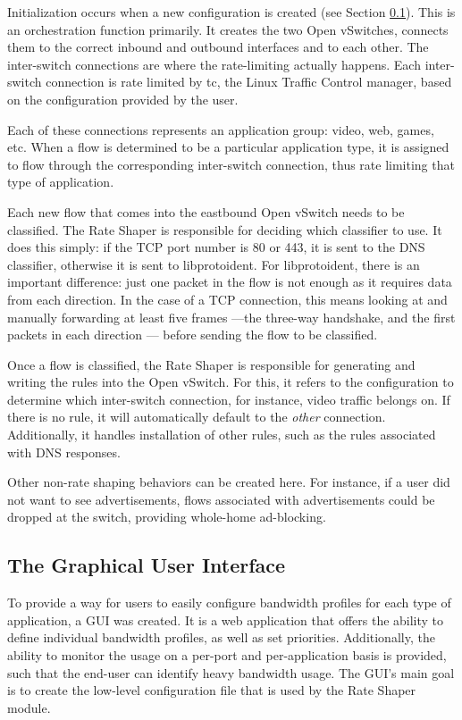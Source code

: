 Initialization occurs when a new configuration is created (see Section \ref{sec:GUI}). This is an orchestration function primarily. It creates the two Open vSwitches, connects them to the correct inbound and outbound interfaces and to each other. The inter-switch connections are where the rate-limiting actually happens. Each inter-switch connection is rate limited by tc, the Linux Traffic Control manager, based on the configuration provided by the user. 

Each of these connections represents an application group: video, web, games, etc. When a flow is determined to be a particular application type, it is assigned to flow through the corresponding inter-switch connection, thus rate limiting that type of application.

Each new flow that comes into the eastbound Open vSwitch needs to be classified. The Rate Shaper is responsible for deciding which classifier to use. It does this simply: if the TCP port number is 80 or 443, it is sent to the DNS classifier, otherwise it is sent to libprotoident. For libprotoident, there is an important difference: just one packet in the flow is not enough as it requires data from each direction. In the case of a TCP connection, this means looking at and manually forwarding at least five frames ---the three-way handshake, and the first packets in each direction --- before sending the flow to be classified.

Once a flow is classified, the Rate Shaper is responsible for generating and writing the rules into the Open vSwitch. For this, it refers to the configuration to determine which inter-switch connection, for instance, video traffic belongs on. If there is no rule, it will automatically default to the \emph{other} connection. Additionally, it handles installation of other rules, such as the rules associated with DNS responses. 

Other non-rate shaping behaviors can be created here. For instance, if a user did not want to see advertisements, flows associated with advertisements could be dropped at the switch, providing whole-home ad-blocking.

\subsection{The Graphical User Interface}
\label{sec:GUI}
To provide a way for users to easily configure bandwidth profiles for each type of application, a GUI was created. It is a web application that offers the ability to define individual bandwidth profiles, as well as set priorities. Additionally, the ability to monitor the usage on a per-port and per-application basis is provided, such that the end-user can identify heavy bandwidth usage. The GUI's main goal is to create the low-level configuration file that is used by the Rate Shaper module. 

